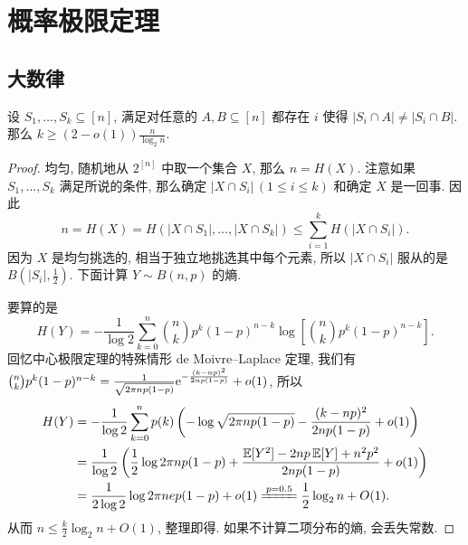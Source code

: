 \documentclass[a4paper, 12pt]{book}
\begin{document}
    \frontmatter
    

    \tableofcontents

    \mainmatter
    
    \chapter{概率极限定理}
    \section{大数律}
    \begin{theorem}
        设 $S_1, \dotsc, S_k \subseteq [n]$, 满足对任意的 $A, B \subseteq [n]$ 都存在 $i$ 使得 $|S_i \cap A| \neq |S_i \cap B|$. 那么 $k \geq (2-o(1)) \frac{n}{\log_2n}$.
    \end{theorem}
    \begin{proof}
        均匀, 随机地从 $2^{[n]}$ 中取一个集合 $X$, 那么 $n=H(X)$. 注意如果 $S_1, \dotsc, S_k$ 满足所说的条件, 那么确定 $|X \cap S_i|\,(1 \leq i \leq k)$ 和确定 $X$ 是一回事. 因此
        \[ n=H(X)=H(|X \cap S_1|, \dotsc, |X \cap S_k|) \leq \sum_{i=1}^k H(|X \cap S_i|). \]
        因为 $X$ 是均匀挑选的, 相当于独立地挑选其中每个元素, 所以 $|X \cap S_i|$ 服从的是 $B \left(|S_i|, \frac{1}{2} \right)$. 下面计算 $Y \sim B(n, p)$ 的熵.
        
        要算的是
        \[ H(Y)=-\frac{1}{\log 2} \sum_{k=0}^n \binom{n}{k} p^k(1-p)^{n-k} \log \left[\binom{n}{k} p^k(1-p)^{n-k} \right]. \]
        回忆中心极限定理的特殊情形 de Moivre--Laplace 定理, 我们有 $\binom{n}{k} p^k(1-p)^{n-k} = \frac{1}{\sqrt{2 \pi np(1-p)}} \mathrm e^{-\frac{(k-np)^2}{2np(1-p)}}+o(1)$, 所以
        \begin{align*}
            H(Y) &= -\frac{1}{\log 2} \sum_{k=0}^n p(k) \left(-\log\sqrt{2 \pi np(1-p)} -\frac{(k-np)^2}{2np(1-p)}+o(1) \right)
            \\& = \frac{1}{\log 2} \left(\frac{1}{2} \log 2 \pi np(1-p) + \frac{\E[Y^2]-2np \E[Y]+n^2p^2}{2np(1-p)}+o(1) \right)
            \\& = \frac{1}{2 \log 2} \log 2 \pi nep(1-p)+o(1) \xlongequal{p=0.5} \frac{1}{2} \log_2n+O(1).
        \end{align*}
        从而 $n \leq \frac{k}{2} \log_2n+O(1)$, 整理即得. 如果不计算二项分布的熵, 会丢失常数.
    \end{proof}
\end{document}
